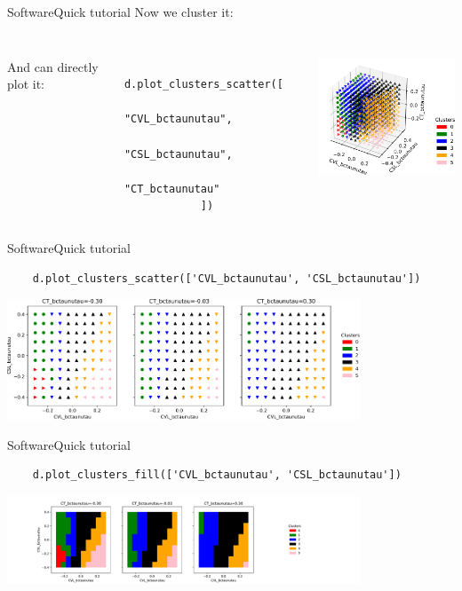 \begin{frame}[fragile]{Software}{Quick tutorial}
    Now we cluster it: 
    
    \inputminted{python}{code/cluster.py}
    
    \begin{columns}
        And can directly plot it:
        
        \begin{changemargin}{0.32cm}{0cm}
        \begin{verbatim}
            d.plot_clusters_scatter([
                "CVL_bctaunutau",
                "CSL_bctaunutau",
                "CT_bctaunutau"   
            ])
        \end{verbatim}
        \end{changemargin}
        \centering
        \includegraphics[width=5.5cm]{figures/plots/3d.pdf}
    \end{columns}
\end{frame}


\begin{frame}[fragile, t]{Software}{Quick tutorial}
\vspace{0.75cm}
\begin{verbatim}
    d.plot_clusters_scatter(['CVL_bctaunutau', 'CSL_bctaunutau'])
\end{verbatim}
\vspace{0.2cm}
\centering
\includegraphics[width=10.5cm]{figures/plots/2dpoints.pdf}
\end{frame}

\begin{frame}[fragile, t]{Software}{Quick tutorial}
\vspace{0.75cm}
\begin{verbatim}
    d.plot_clusters_fill(['CVL_bctaunutau', 'CSL_bctaunutau'])
\end{verbatim}
\centering
\includegraphics[trim=3cm 0 11cm 0, clip, width=10.5cm]{figures/plots/2dfill.pdf}
\end{frame}

